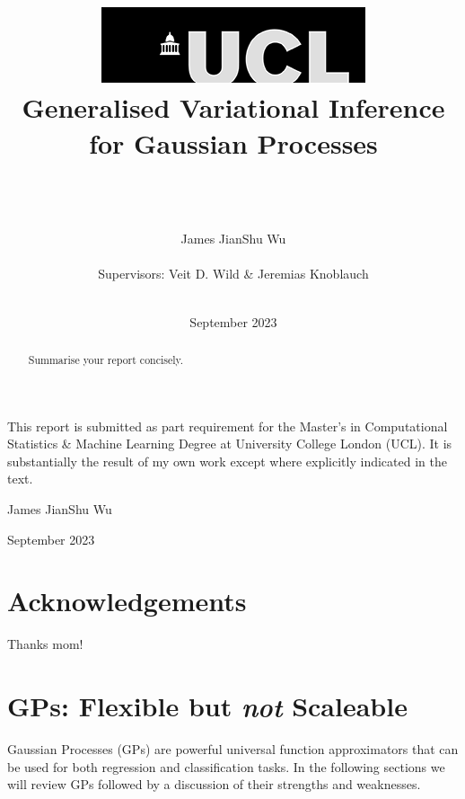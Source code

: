 \documentclass{article}
\title{  	{ \includegraphics[scale=.5]{ucl_logo.png}}\\ 
{{\Huge  Generalised Variational Inference \\ for Gaussian Processes}}\\ 
{ }\\ 
		}
\date{September 2023}
\author{\\ \Large James JianShu Wu
\\ \\
Supervisors: Veit D. Wild \& Jeremias Knoblauch
\\ \\ }
\numberwithin{equation}{section}
\begin{document}
\onehalfspacing
\maketitle
{}
\newpage
\setcounter{page}{1}

This report is submitted as part requirement for the Master's in Computational Statistics \& Machine Learning Degree at University College London (UCL). It is substantially the result of my own work except where explicitly indicated in the text.

\begin{flushright}
    James JianShu Wu
    
    September 2023
\end{flushright}
\newpage


\section*{Acknowledgements}
Thanks mom!
\newpage

\begin{abstract}
Summarise your report concisely.
\end{abstract}
\newpage
\tableofcontents
\newpage
{}
\setcounter{page}{1}
\section{GPs: Flexible but \textit{not} Scaleable}
Gaussian Processes (GPs) are powerful universal function approximators that can be used for both regression and classification tasks. In the following sections we will review GPs followed by a discussion of their strengths and weaknesses.
\end{document}
